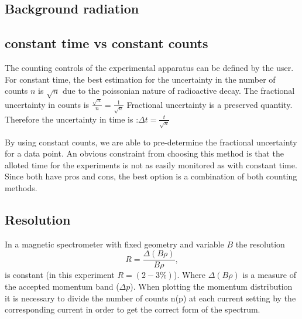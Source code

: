 \documentclass[10pt, a4paper]{article}
\begin{document}
\begin{multicols}{2}
\subsection{Background radiation}

\subsection{constant time vs constant counts}
The counting controls of the experimental apparatus can be defined by the user.
For constant time, the best estimation for the uncertainty in the number of counts $n$ is $\sqrt{n}$\cite{SPA} due to the poissonian nature of radioactive decay. 
The fractional uncertainty in counts is $\frac{\sqrt{n}}{n} = \frac{1}{\sqrt{n}}$
Fractional uncertainty is a preserved quantity. Therefore the uncertainty in time
is :$ \Delta t = \frac{t}{\sqrt{n}}$ 

By using constant counts, we are able to pre-determine the fractional uncertainty for a data point. 
An obvious constraint from choosing this method is that the alloted time for the experiments is not as easily monitored as with constant time. 
Since both have pros and cons, the best option is a combination of both counting methods.

\subsection{Resolution}
In a magnetic spectrometer with fixed geometry and variable $B$ the resolution 
\begin{equation}R = \frac{\Delta(B \rho)}{B \rho},
\end{equation}
is constant (in this experiment $R = (2-3\%)$). 
Where $\Delta(B \rho)$ is a measure of the accepted momentum band ($\Delta p$). 
When plotting the momentum distribution it is necessary to divide the number of counts n(p) at each current setting by the corresponding current in order to get the correct form of the spectrum\cite{Siegbahn}.



\end{multicols}
\end{document}

